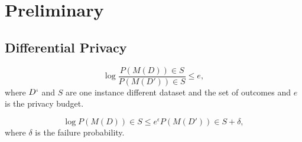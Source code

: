 \chapter{Preliminary}
\section{Differential Privacy}

\begin{equation}
	\log \frac{P(M(D))\in S}{P(M(D'))\in S} \leq e,
	\label{eq:privacy_loss}
\end{equation}
where $D`$ and $S$ are one instance different dataset and the set of outcomes and $e$ is the privacy budget.

\begin{equation}
	\log P(M(D))\in S \leq e^\epsilon P(M(D'))\in S + \delta, 
	\label{eq:eps_del_diff_privacy}
\end{equation}
where $\delta$ is the failure probability.

